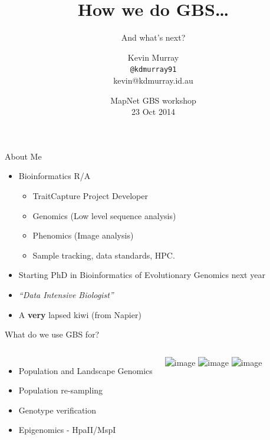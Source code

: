 \documentclass{beamer}
\title{How we do GBS\ldots}
\subtitle{And what's next?}
\author{Kevin Murray\\\tiny{\texttt{@kdmurray91}\\kevin@kdmurray.id.au}}
\institute{Borevitz Lab, ANU}
\date{MapNet GBS workshop\\23 Oct 2014}
\begin{document}
{
\begin{frame}
  \titlepage
  \vfill
\end{frame}
}

\begin{frame}{About Me}
  \begin{itemize}
    \item Bioinformatics R/A
    \begin{itemize}
      \item TraitCapture Project Developer
      \item Genomics (Low level sequence analysis)
      \item Phenomics (Image analysis)
      \item Sample tracking, data standards, HPC.
    \end{itemize}
    \item Starting PhD in Bioinformatics of Evolutionary Genomics next
      year
    \item \textit{``Data Intensive Biologist''}
    \pause
    \item A \textbf{very} lapsed kiwi (from Napier)
  \end{itemize}
\end{frame}

\begin{frame}{What do we use GBS for?}
  \begin{columns}[c]
    \begin{itemize}
      \item Population and Landscape Genomics
      \item Population re-sampling
      \item Genotype verification
      \item Epigenomics - HpaII/MspI
    \end{itemize}
    \includegraphics<1>[width=0.8\textwidth]{img/landscape_genomics.png}
    \includegraphics<2>[width=0.7\textwidth]{img/resampling.png}
    \includegraphics<3>[width=0.8\textwidth]{img/expt.png}
  \end{columns}
  \vfill
\end{frame}
\end{document}
